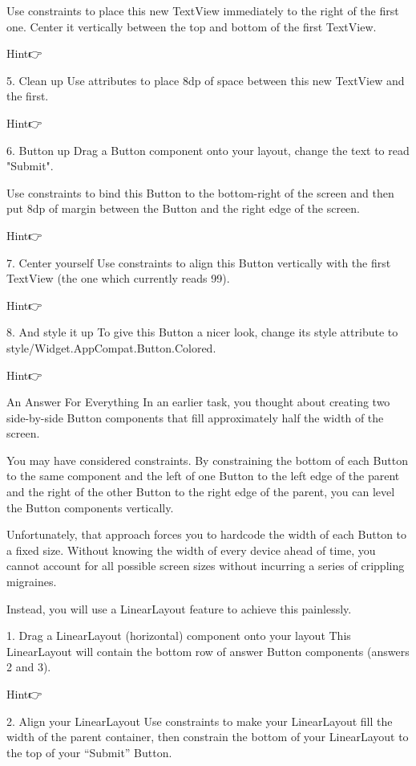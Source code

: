         Use constraints to place this new TextView immediately to the right of the first one. Center it vertically between the top and bottom of the first TextView.

        Hint👉

    5. Clean up
        Use attributes to place 8dp of space between this new TextView and the first.

        Hint👉

    6. Button up
        Drag a Button component onto your layout, change the text to read "Submit".

        Use constraints to bind this Button to the bottom-right of the screen and then put 8dp of margin between the Button and the right edge of the screen.

        Hint👉

    7. Center yourself
        Use constraints to align this Button vertically with the first TextView (the one which currently reads 99).

        Hint👉

    8. And style it up
        To give this Button a nicer look, change its style attribute to style/Widget.AppCompat.Button.Colored.

        Hint👉

    An Answer For Everything
        In an earlier task, you thought about creating two side-by-side Button components that fill approximately half the width of the screen.

        You may have considered constraints. By constraining the bottom of each Button to the same component and the left of one Button to the left edge of the parent and the right of the other Button to the right edge of the parent, you can level the Button components vertically.

        Unfortunately, that approach forces you to hardcode the width of each Button to a fixed size. Without knowing the width of every device ahead of time, you cannot account for all possible screen sizes without incurring a series of crippling migraines.

        Instead, you will use a LinearLayout feature to achieve this painlessly.

        1. Drag a LinearLayout (horizontal) component onto your layout
        This LinearLayout will contain the bottom row of answer Button components (answers 2 and 3).

        Hint👉

    2. Align your LinearLayout
        Use constraints to make your LinearLayout fill the width of the parent container, then constrain the bottom of your LinearLayout to the top of your “Submit” Button.

